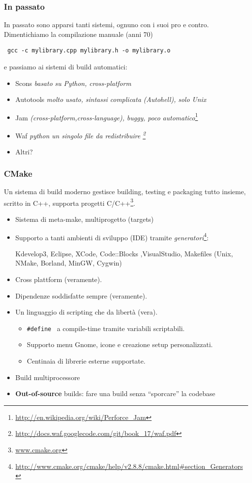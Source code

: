 \documentclass[10pt] {beamer}
\begin{document}
\begin{frame}[fragile]
\frametitle{In passato}
In passato sono apparsi tanti sistemi, ognuno con i suoi pro e contro. Dimentichiamo la compilazione manuale (anni 70)
\begin{verbatim}
 gcc -c mylibrary.cpp mylibrary.h -o mylibrary.o
\end{verbatim}
e passiamo ai sistemi di build automatici:

\begin{itemize}
\item<1-> Scons \textit{basato su Python, cross-platform}
\item<2-> Autotools \textit{ molto usato, sintassi complicata (Autohell), solo Unix }
\item<3-> Jam \textit{ (cross-platform,cross-language), buggy, poco automatico}\footnote{\url{http://en.wikipedia.org/wiki/Perforce_Jam}}
\item<4-> Waf \textit{ python un singolo file da redistribuire \footnote{\url{http://docs.waf.googlecode.com/git/book_17/waf.pdf}}}
\item<5-> Altri?
\end{itemize}
\end{frame}


\begin{frame}
\frametitle{CMake}
Un sistema di build moderno gestisce building, testing e packaging tutto insieme, scritto in C++, supporta progetti C/C++\footnote{\url{www.cmake.org}}.
\begin{itemize}
		\item<1-> Sistema di meta-make, multiprogetto (targets)
		\item<2-> Supporto a tanti ambienti di sviluppo (IDE) tramite \emph{generatori}\footnote{\url{http://www.cmake.org/cmake/help/v2.8.8/cmake.html\#section\_Generators}}: 

Kdevelop3, Eclipse, XCode, Code::Blocks ,VisualStudio, Makefiles (Unix, NMake, Borland, MinGW, Cygwin)

		\item<3-> Cross plattform (veramente).
		\item<4-> Dipendenze soddisfatte sempre (veramente).
		\item<5-> Un linguaggio di scripting che da libertà (vera).
		\begin{itemize}
			\item<6-> \texttt{\#define } a compile-time tramite variabili scriptabili.
			\item<7-> Supporto menu Gnome, icone e creazione setup personalizzati.
			\item<8-> Centinaia di librerie esterne supportate.
		\end{itemize}
		\item<9-> Build multiprocessore
		\item<10-> \textbf{Out-of-source} builds: fare una build senza ``sporcare'' la codebase
\end{itemize}
\end{frame}
\end{document}
